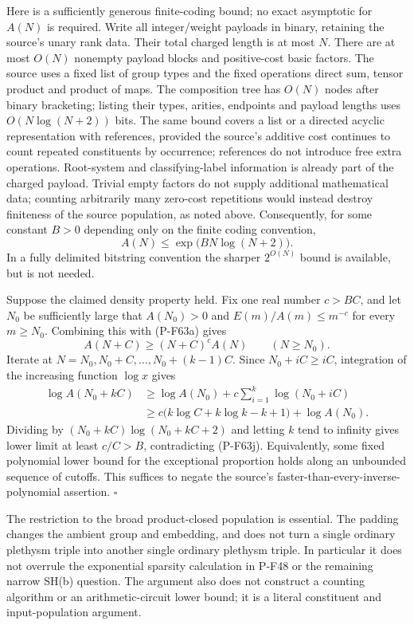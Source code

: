 Here is a sufficiently generous finite-coding bound; no exact
asymptotic for $A(N)$ is required.  Write all integer/weight
payloads in binary, retaining the source's unary rank data.
Their total charged length is at most $N$.  There are at most
$O(N)$ nonempty payload blocks and positive-cost basic factors.
The source uses a fixed list of group types and the fixed
operations direct sum, tensor product and product of maps.
The composition tree has $O(N)$ nodes after binary bracketing;
listing their types, arities, endpoints and payload lengths
uses $O(N\log(N+2))$ bits.  The same bound covers a list or a
directed acyclic representation with references, provided the
source's additive cost continues to count repeated constituents
by occurrence; references do not introduce free extra operations.
Root-system
and classifying-label information is already part of the
charged payload.  Trivial empty factors do not supply
additional mathematical data; counting arbitrarily many
zero-cost repetitions would instead destroy finiteness of the
source population, as noted above.  Consequently, for some
constant $B>0$ depending only on the finite coding convention,
\[
            A(N)\le\exp\bigl(BN\log(N+2)\bigr).
                                                        \tag{P-F63j}
\]
In a fully delimited bitstring convention the sharper
$2^{O(N)}$ bound is available, but is not needed.

Suppose the claimed density property held.  Fix one real
number $c>BC$, and let $N_0$ be sufficiently large that
$A(N_0)>0$ and
$E(m)/A(m)\le m^{-c}$ for every $m\ge N_0$.
Combining this with (P-F63a) gives
\[
       A(N+C)\ge (N+C)^c A(N)\qquad(N\ge N_0).
                                                        \tag{P-F63k}
\]
Iterate at $N=N_0,N_0+C,\ldots,N_0+(k-1)C$.
Since $N_0+iC\ge iC$, integration of the increasing function
$\log x$ gives
\[
 \begin{split}
 \log A(N_0+kC)
 &\ge\log A(N_0)+c\sum_{i=1}^k\log(N_0+iC)\\
 &\ge c\bigl(k\log C+k\log k-k+1\bigr)+\log A(N_0).
 \end{split}                                           \tag{P-F63l}
\]
Dividing by $(N_0+kC)\log(N_0+kC+2)$ and letting $k$ tend
to infinity gives lower limit at least $c/C>B$,
contradicting (P-F63j).  Equivalently, some fixed polynomial
lower bound for the exceptional proportion holds along an
unbounded sequence of cutoffs.  This suffices to negate the
source's faster-than-every-inverse-polynomial assertion.
\hfill$\square$

The restriction to the broad product-closed population is
essential.  The padding changes the ambient group and embedding,
and does not turn a single ordinary plethysm triple into another
single ordinary plethysm triple.  In particular it does not
overrule the exponential sparsity calculation in P-F48 or the
remaining narrow SH(b) question.  The argument also does not
construct a counting algorithm or an arithmetic-circuit lower
bound; it is a literal constituent and input-population argument.
